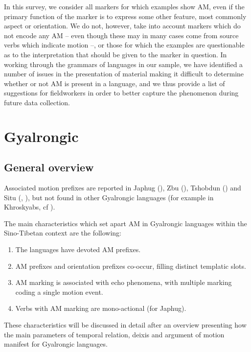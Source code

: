 \documentclass[oneside,a4paper,11pt]{article}
\begin{document}
In this survey, we consider all markers for which examples show AM, even if the primary function of the marker is to express some other feature, most commonly aspect or orientation.  We do not, however, take into account markers which do not encode any AM -- even though these may in many cases come from source verbs which indicate motion --, or those for which the examples are questionable as to the interpretation that should be given to the marker in question.  In working through the grammars of languages in our sample, we have identified a number of issues in the presentation of material making it difficult to determine whether or not AM is present in a language, and we thus provide a list of suggestions for fieldworkers in order to better capture the phenomenon during future data collection.


\section{Gyalrongic}

\subsection{General overview}
Associated motion prefixes are reported in Japhug (\citealt{jacques13harmonization}), Zbu (\citealt{gong18these}), Tshobdun (\citealt{jackson14morpho}) and Situ (\citealt[200-204]{zhang16bragdbar}, \citealt[497-500]{prins16kyomkyo}), but not found in other Gyalrongic languages (for example in Khroskyabs, cf \citealt{lai17khroskyabs}).
 
The main characteristics which set apart AM in Gyalrongic languages within the Sino-Tibetan context are the following:

\begin{enumerate}
\item The languages have devoted AM prefixes.
\item AM prefixes and orientation prefixes co-occur, filling distinct templatic slots.
\item AM marking is associated with echo phenomena, with multiple marking coding a single motion event.
\item Verbs with AM marking are mono-actional (for Japhug).
\end{enumerate}

These characteristics will be discussed in detail after an overview presenting how the main parameters of temporal relation, deixis and argument of motion manifest for Gyalrongic languages.
\end{document}
